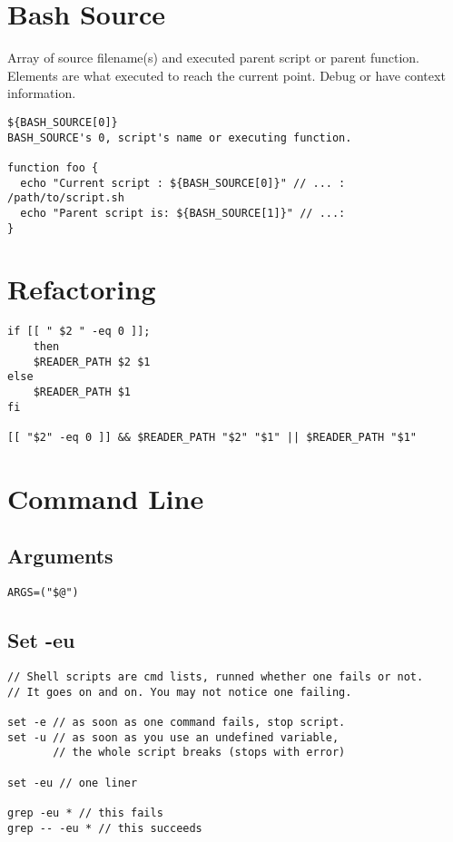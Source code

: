 \section{Bash Source}

Array of source filename(s) and executed parent script or parent function.
Elements are what executed to reach the current point.
Debug or have context information.

\begin{verbatim}
${BASH_SOURCE[0]}
BASH_SOURCE's 0, script's name or executing function.

function foo {
  echo "Current script : ${BASH_SOURCE[0]}" // ... : /path/to/script.sh
  echo "Parent script is: ${BASH_SOURCE[1]}" // ...: 
}
\end{verbatim}

\section{Refactoring}

\begin{verbatim}
if [[ " $2 " -eq 0 ]];
    then
    $READER_PATH $2 $1
else
    $READER_PATH $1
fi

[[ "$2" -eq 0 ]] && $READER_PATH "$2" "$1" || $READER_PATH "$1"
\end{verbatim}

\section{Command Line}

\subsection{Arguments}

\begin{verbatim}
ARGS=("$@")
\end{verbatim}

\subsection{Set -eu}

\begin{verbatim}
// Shell scripts are cmd lists, runned whether one fails or not.
// It goes on and on. You may not notice one failing. 

set -e // as soon as one command fails, stop script. 
set -u // as soon as you use an undefined variable, 
       // the whole script breaks (stops with error)

set -eu // one liner

grep -eu * // this fails
grep -- -eu * // this succeeds
\end{verbatim}

